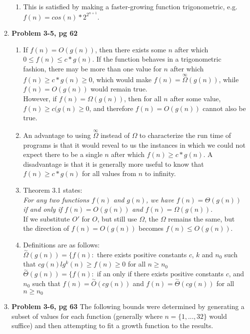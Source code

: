 \documentclass{article}
\begin{document}
\begin{enumerate}
\begin{enumerate}
    \item This is satisfied by making a faster-growing function trigonometric, e.g.\ $f(n) = cos(n)*2^{2^{n+1}}$.
    \end{enumerate}
\item \textbf{Problem 3-5, pg 62}
\begin{enumerate}
\item If $f(n) = O(g(n))$, then there exists some $n$ after which $0 \leq f(n) \leq c*g(n)$. If the function behaves in a trigonometric fashion, there may be more than one value for $n$ after which $f(n) \geq c*g(n) \geq 0$, which would make $f(n) = \overset{\infty}{\Omega}(g(n))$, while $f(n) = O(g(n))$ would remain true.
\\
However, if $f(n) = \Omega(g(n))$, then for all $n$ after some value, $f(n) \geq c(g(n) \geq 0$, and therefore $f(n) = O(g(n))$ cannot also be true.
\item An advantage to using $\overset{\infty}{\Omega}$ instead of $\Omega$ to characterize the run time of programs is that it would reveal to us the instances in which we could not expect there to be a single $n$ after which $f(n) \geq c*g(n)$. A disadvantage is that it is generally more useful to know that $f(n) \geq c*g(n)$ for all values from $n$ to infinity. 
\item Theorem 3.1 states: \\
\emph{For any two functions $f(n)$ and $g(n)$, we have $f(n)=\Theta(g(n))$ if and only if $f(n) = O(g(n))$ and $f(n)=\Omega(g(n))$.}\\
If we substitute $O'$ for $O$, but still use $\Omega$, the $\Omega$ remains the same, but the direction of $f(n) = O(g(n))$ becomes $f(n) \leq O(g(n))$.
\item Definitions are as follows: \\
$\overset{\sim}{\Omega}(g(n)) = \{f(n):$ there exists positive constants $c$, $k$ and $n_{0}$ such that $cg(n)lg^{k}(n) \geq f(n) \geq 0$ for all $n \geq n_{0}$ \\
$\overset{\sim}{\Theta}(g(n)) = \{f(n):$ if an only if there exists positive constants $c$, and $n_{0}$ such that $f(n) = \overset{\sim}{O}(cg(n))$ and $f(n) = \overset{\sim}{\Theta}(cg(n))$ for all $n \geq n_{0}$ \\ 
\end{enumerate}
\item \textbf{Problem 3-6, pg 63} The following bounds were determined by generating a subset of values for each function (generally where $n=\{1,...,32\}$ would suffice) and then attempting to fit a growth function to the results. 

\end{enumerate}
\end{document}
